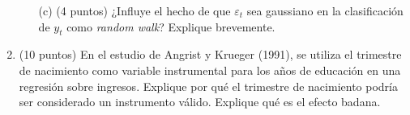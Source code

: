 \documentclass[10pt,a4paper]{article}
\begin{document}
\begin{enumerate}
\begin{enumerate}
    \item[(c)]  (4 puntos) ¿Influye el hecho de que \( \varepsilon_t \) sea gaussiano en la clasificación de \( y_t \) como \textit{random walk}? Explique brevemente.
\end{enumerate}


    

\item (10 puntos)
En el estudio de Angrist y Krueger (1991), se utiliza el trimestre de nacimiento como variable instrumental para los años de educación en una regresión sobre ingresos. 
 Explique por qué el trimestre de nacimiento podría ser considerado un instrumento válido. 
    Explique qué es el efecto badana.

        

\end{enumerate}
\end{document}
